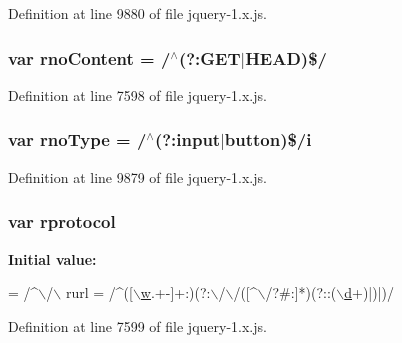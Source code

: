 Definition at line 9880 of file jquery-\/1.\+x.\+js.

\subsubsection[{\texorpdfstring{rno\+Content}{rnoContent}}]{\setlength{\rightskip}{0pt plus 5cm}var rno\+Content = /$^\wedge$(?\+:G\+ET$\vert$H\+E\+AD)\$/}\hypertarget{jquery-1_8x_8js_a537d744d72e31ec312aa3f16ef576d3f}{}\label{jquery-1_8x_8js_a537d744d72e31ec312aa3f16ef576d3f}


Definition at line 7598 of file jquery-\/1.\+x.\+js.

\subsubsection[{\texorpdfstring{rno\+Type}{rnoType}}]{\setlength{\rightskip}{0pt plus 5cm}var rno\+Type = /$^\wedge$(?\+:input$\vert$button)\$/{\bf i}}\hypertarget{jquery-1_8x_8js_aba62df0b2591b6534016a48daf198df4}{}\label{jquery-1_8x_8js_aba62df0b2591b6534016a48daf198df4}


Definition at line 9879 of file jquery-\/1.\+x.\+js.

\subsubsection[{\texorpdfstring{rprotocol}{rprotocol}}]{\setlength{\rightskip}{0pt plus 5cm}var rprotocol}\hypertarget{jquery-1_8x_8js_a0f02b710647fcf95e74593954fb9b4cb}{}\label{jquery-1_8x_8js_a0f02b710647fcf95e74593954fb9b4cb}
{\bfseries Initial value\+:}
\begin{DoxyCode}
= /^\(\backslash\)/\(\backslash\)
    rurl = /^([\hyperlink{jquery-1_8x_8min_8js_a9721a992655f700bdc2e91ba68b71e26}{\(\backslash\)w}.+-]+:)(?:\(\backslash\)/\(\backslash\)/([^\(\backslash\)/?#:]*)(?::(\hyperlink{jquery-1_8x_8min_8js_aeb337d295abaddb5ec3cb34cc2e2bbc9}{\(\backslash\)d}+)|)|)/
\end{DoxyCode}


Definition at line 7599 of file jquery-\/1.\+x.\+js.

